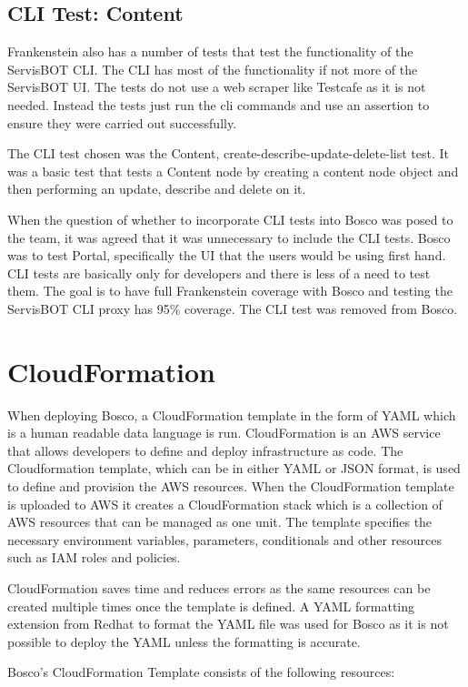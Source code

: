 \documentclass[12pt,a4paper,titlepage]{report}
\begin{document}
\subsection{CLI Test: Content}
Frankenstein also has a number of tests that test the functionality of the ServisBOT \ac{CLI}. The CLI has most of the functionality if not more of the ServisBOT UI. 
The tests do not use a web scraper like Testcafe as it is not needed. 
Instead the tests just run the cli commands and use an assertion to ensure they were carried out successfully. 

The CLI test chosen was the Content, create-describe-update-delete-list test. It was a basic test that tests a Content node by creating a content node object and then performing an update, describe and delete on it.

When the question of whether to incorporate CLI tests into Bosco was posed to the team, it was agreed that it was unnecessary to include the CLI tests. Bosco was to test Portal, specifically the \ac{UI} that the users would 
be using first hand. CLI tests are basically only for developers and there is less of a need to test them. The goal is to have full Frankenstein coverage with Bosco and testing the ServisBOT CLI proxy has 95\% coverage. 
The CLI test was removed from Bosco.

\section{CloudFormation}
When deploying Bosco, a  CloudFormation template in the form of YAML which is a human readable data language is run.  CloudFormation is an AWS service that allows developers to define and deploy infrastructure as code.
The Cloudformation template, which can be in either YAML or JSON format, is used to define and provision the AWS resources. When the CloudFormation template is uploaded to AWS it 
creates a CloudFormation stack which is a collection of AWS resources that can be managed as one unit. 
The template specifies the necessary environment variables, parameters, conditionals and other resources such as \ac{IAM} roles and policies. 

CloudFormation saves time and reduces errors as the same resources can be created multiple times once the template is defined.
A YAML formatting extension from Redhat to format the YAML file was used for Bosco as it is not possible to deploy the YAML unless the formatting is accurate.

Bosco's CloudFormation Template consists of the following resources:
\end{document}
